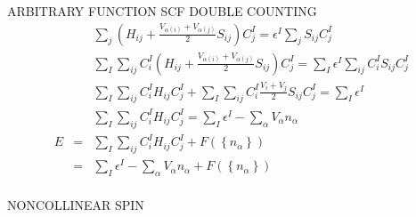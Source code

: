 \documentclass{article}
\begin{document}
ARBITRARY FUNCTION SCF DOUBLE COUNTING
\begin{eqnarray*}
&& 
  \sum_j { \left( H_{ij} + 
    \frac{ V_{\alpha(i)}  + V_{\alpha(j)}   }{2} S_{ij} \right)  C^I_{j}}
    = \epsilon^I \sum_j S_{ij} C^I_j \\
&& 
\sum_I \sum_{ij} { C^I_i \left( H_{ij} + 
    \frac{ V_{\alpha(i)}  + V_{\alpha(j)}   }{2} S_{ij} \right)  C^I_{j}}
    = \sum_I \epsilon^I \sum_{ij} C^I_i S_{ij} C^I_j \\
&& 
\sum_I \sum_{ij} C^I_i H_{ij} C^I_j + \sum_I \sum_{ij} C^I_i \frac{V_i + V_j}{2} S_{ij} C^I_j = \sum_I \epsilon^I \\
&& 
\sum_I \sum_{ij} C^I_i H_{ij} C^I_j = \sum_I \epsilon^I - \sum_\alpha V_\alpha n_\alpha \\
E & = & \sum_I \sum_{ij} C^I_i H_{ij} C^I_j + F(\left\{ n_\alpha \right\} ) \\
  & = & \sum_I \epsilon^I - \sum_\alpha V_\alpha n_\alpha + F(\left\{ n_\alpha \right\} ) \\
\end{eqnarray*}

NONCOLLINEAR SPIN
\end{document}
